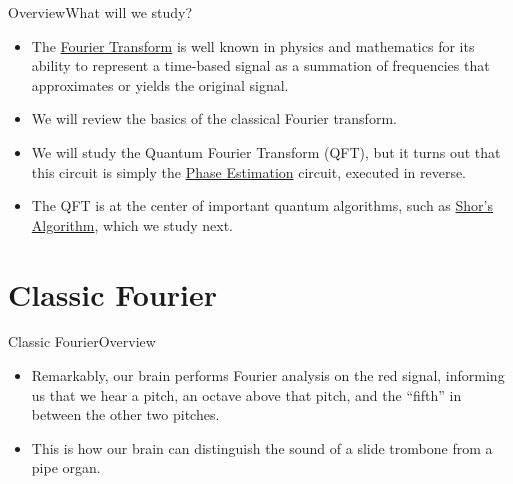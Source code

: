 
\begin{frame}{Overview}{What will we study?}

\begin{itemize}
    \item The \href{https://en.wikipedia.org/wiki/Fourier_transform}{Fourier Transform} is well known in physics and mathematics for its ability to represent a time-based signal as a summation of frequencies that approximates or yields the original signal.
    \item We will review the basics of the classical Fourier transform.
    \item We will study the Quantum Fourier Transform (QFT), but it turns out that this circuit is simply the \href{https://en.wikipedia.org/wiki/Quantum_phase_estimation_algorithm}{Phase Estimation} circuit, executed in reverse.
    \item The QFT is at the center of important quantum algorithms, such as \href{https://en.wikipedia.org/wiki/Shor\%27s_algorithm}{Shor's Algorithm}, which we study next.
\end{itemize}
\end{frame}

\section*{Classic Fourier}

\begin{frame}{Classic Fourier}{Overview}
\Vskip{-3em}%
%
\Vskip{-1.5em}\begin{itemize}
    \item Remarkably, our brain performs Fourier analysis on the red signal, informing us that we hear a pitch, an octave above that pitch, and the ``fifth'' in between the other two pitches.
    \item This is how our brain can distinguish the sound of a slide trombone from a pipe organ.
   
\end{itemize}%

\end{frame}

